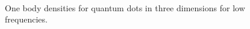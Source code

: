 \begin{figure}
\begin{center}
     \\
  \caption{One body densities for quantum dots in three dimensions for low frequencies.}
  \label{fig:OBD_QDOTS3D_lowfreq}
 \end{center}
\end{figure}

